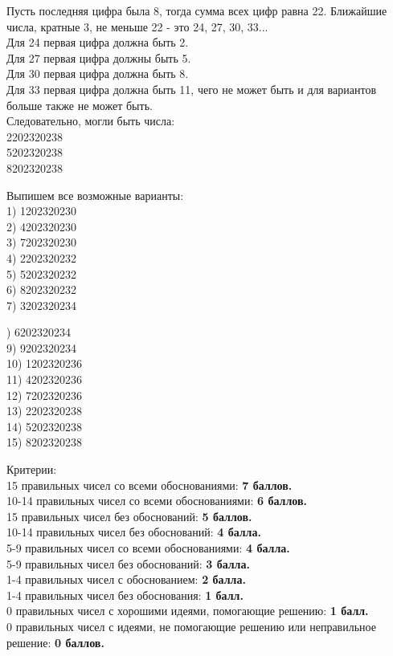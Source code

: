 Пусть последняя цифра была 8, тогда сумма всех цифр равна 22. Ближайшие числа, кратные 3, не меньше 22 - это 24, 27, 30, 33...\\
Для 24 первая цифра должна быть 2.\\
Для 27 первая цифра должны быть 5.\\
Для 30 первая цифра должна быть 8.\\
Для 33 первая цифра должна быть 11, чего не может быть и для вариантов больше также не может быть.\\
Следовательно, могли быть числа:\\
2202320238\\
5202320238\\
8202320238 

Выпишем все возможные варианты:\\
1) 1202320230\\
2) 4202320230\\
3) 7202320230\\
4) 2202320232\\
5) 5202320232\\
6) 8202320232\\ 
7) 3202320234

\newpage

\hspace{3mm}


) 6202320234\\
9) 9202320234\\ 
10) 1202320236\\
11) 4202320236\\
12) 7202320236\\ 
13) 2202320238\\
14) 5202320238\\
15) 8202320238 

\hspace{3mm}

Критерии:\\
15 правильных чисел со всеми обоснованиями: \textbf{7 баллов.}\\
10-14 правильных чисел со всеми обоснованиями: \textbf{6 баллов.}\\
15 правильных чисел без обоснований: \textbf{5 баллов.}\\
10-14 правильных чисел без обоснований: \textbf{4 балла.}\\
5-9 правильных чисел со всеми обоснованиями: \textbf{4 балла.}\\
5-9 правильных чисел без обоснований: \textbf{3 балла.}\\
1-4 правильных чисел с обоснованием: \textbf{2 балла.}\\
1-4 правильных чисел без обоснования: \textbf{1 балл.}\\
0 правильных чисел с хорошими идеями, помогающие решению: \textbf{1 балл.}\\
0 правильных чисел с идеями, не помогающие решению или неправильное решение: \textbf{0 баллов.}
